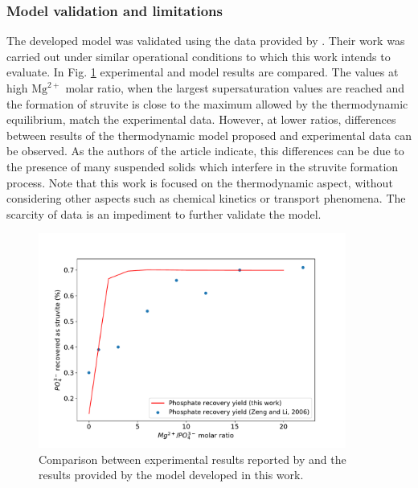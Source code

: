\begin{refsection}[referencesCh3]
\subsubsection{Model validation and limitations}
The developed model was validated using the data provided by \citet{Zeng}. Their work was carried out under similar operational conditions to which this work intends to evaluate. In Fig. \ref{fig:validation} experimental and model results are compared. The values at high $\text{Mg}^{2+}$ molar ratio, when the largest supersaturation values are reached and the formation of struvite is close to the maximum allowed by the thermodynamic equilibrium, match the experimental data. However, at lower ratios, differences between results of the thermodynamic model proposed and experimental data can be observed. As the authors of the article indicate, this differences can be due to the presence of many suspended solids which interfere in the struvite formation process. Note that this work is focused on the thermodynamic aspect, without considering other aspects such as chemical kinetics or transport phenomena. The scarcity of data is an impediment to further validate the model.
\begin{figure}[h] 
	\centering
	\includegraphics[width=0.9\textwidth, trim=0 0cm 0 1.5cm, clip]{gfx/Chapter3/validation.pdf} 
	\caption{Comparison between experimental results reported by \protect\citet{Zeng} and the results provided by the model developed in this work.} \label{fig:validation}
\end{figure}


\end{refsection}
